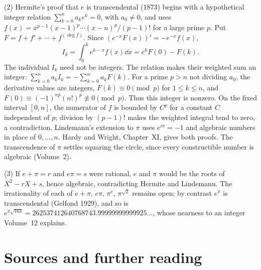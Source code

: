 (2) Hermite's proof that $e$ is transcendental (1873) begins with a hypothetical integer relation $\sum_{k=0}^n a_ke^k=0$, with $a_0\ne0$, and uses
$f(x)=x^{p-1}(x-1)^p\cdots(x-n)^p/(p-1)!$ for a large prime $p$.
Put $F=f+f'+\cdots+f^{(\deg f)}$. Since $(e^{-x}F(x))'=-e^{-x}f(x)$,
\[
I_k=\int_0^k e^{k-x}f(x)\dd x=e^kF(0)-F(k).
\]
The individual $I_k$ need not be integers. The relation makes their weighted sum an integer:
$\sum_{k=0}^n a_kI_k=-\sum_{k=0}^n a_kF(k)$.
For a prime $p>n$ not dividing $a_0$, the derivative values are integers, $F(k)\equiv0\pmod p$ for $1\le k\le n$, and
$F(0)\equiv(-1)^{np}(n!)^p\not\equiv0\pmod p$.
Thus this integer is nonzero. On the fixed interval $[0,n]$, the numerator of $f$ is bounded by $C^p$ for a constant $C$ independent of $p$; division by $(p-1)!$ makes the weighted integral tend to zero, a contradiction.
Lindemann's extension to $\pi$ uses $e^{i\pi}=-1$ and algebraic numbers in place of $0,\dots,n$. Hardy and Wright, Chapter~XI, gives both proofs. The transcendence of $\pi$ settles squaring the circle, since every constructible number is algebraic (Volume~2).

(3) If $e+\pi=r$ and $e\pi=s$ were rational, $e$ and $\pi$ would be the roots of $X^2-rX+s$, hence algebraic, contradicting Hermite and Lindemann. The irrationality of each of $e+\pi$, $e\pi$, $\pi^e$, $\pi^{\sqrt2}$ remains open; by contrast $e^\pi$ is transcendental (Gelfond 1929), and so is $e^{\pi\sqrt{163}}=262537412640768743.99999999999925\ldots$, whose nearness to an integer Volume~12 explains.

\section*{Sources and further reading}

